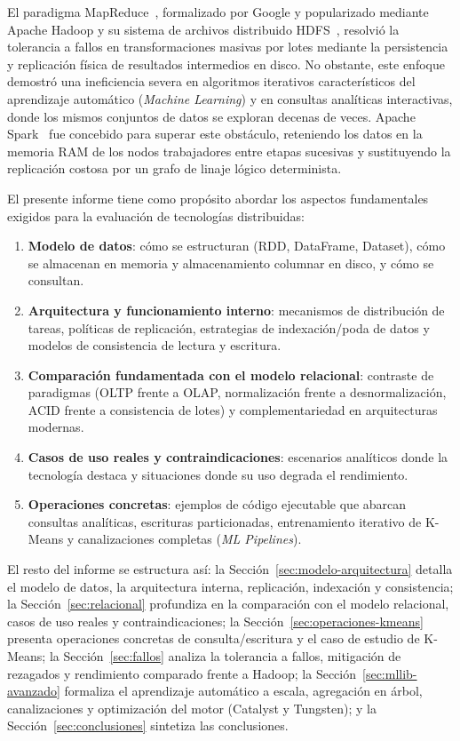 \documentclass[conference,a4paper]{IEEEtran}
\begin{document}
El paradigma MapReduce~\cite{dean2004mapreduce}, formalizado por Google y popularizado mediante Apache Hadoop y su sistema de archivos distribuido HDFS~\cite{shvachko2010hdfs}, resolvió la tolerancia a fallos en transformaciones masivas por lotes mediante la persistencia y replicación física de resultados intermedios en disco. No obstante, este enfoque demostró una ineficiencia severa en algoritmos iterativos característicos del aprendizaje automático (\textit{Machine Learning}) y en consultas analíticas interactivas, donde los mismos conjuntos de datos se exploran decenas de veces. Apache Spark~\cite{zaharia2010spark,zaharia2012rdd} fue concebido para superar este obstáculo, reteniendo los datos en la memoria RAM de los nodos trabajadores entre etapas sucesivas y sustituyendo la replicación costosa por un grafo de linaje lógico determinista.

El presente informe tiene como propósito abordar los aspectos fundamentales exigidos para la evaluación de tecnologías distribuidas:
\begin{enumerate}
\item \textbf{Modelo de datos}: cómo se estructuran (RDD, DataFrame, Dataset), cómo se almacenan en memoria y almacenamiento columnar en disco, y cómo se consultan.
\item \textbf{Arquitectura y funcionamiento interno}: mecanismos de distribución de tareas, políticas de replicación, estrategias de indexación/poda de datos y modelos de consistencia de lectura y escritura.
\item \textbf{Comparación fundamentada con el modelo relacional}: contraste de paradigmas (OLTP frente a OLAP, normalización frente a desnormalización, ACID frente a consistencia de lotes) y complementariedad en arquitecturas modernas.
\item \textbf{Casos de uso reales y contraindicaciones}: escenarios analíticos donde la tecnología destaca y situaciones donde su uso degrada el rendimiento.
\item \textbf{Operaciones concretas}: ejemplos de código ejecutable que abarcan consultas analíticas, escrituras particionadas, entrenamiento iterativo de K-Means y canalizaciones completas (\textit{ML Pipelines}).
\end{enumerate}

El resto del informe se estructura así: la Sección~\ref{sec:modelo-arquitectura} detalla el modelo de datos, la arquitectura interna, replicación, indexación y consistencia; la Sección~\ref{sec:relacional} profundiza en la comparación con el modelo relacional, casos de uso reales y contraindicaciones; la Sección~\ref{sec:operaciones-kmeans} presenta operaciones concretas de consulta/escritura y el caso de estudio de K-Means; la Sección~\ref{sec:fallos} analiza la tolerancia a fallos, mitigación de rezagados y rendimiento comparado frente a Hadoop; la Sección~\ref{sec:mllib-avanzado} formaliza el aprendizaje automático a escala, agregación en árbol, canalizaciones y optimización del motor (Catalyst y Tungsten); y la Sección~\ref{sec:conclusiones} sintetiza las conclusiones.
\end{document}

